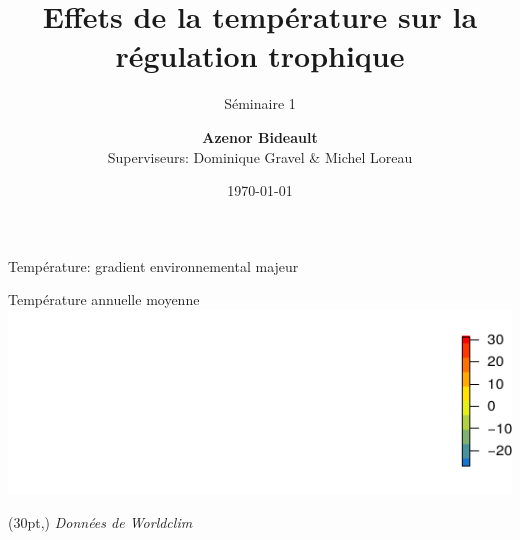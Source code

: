 \documentclass[11pt, compress, aspectratio=1610]{beamer}
\title{Effets de la température sur la régulation trophique}
\subtitle{Séminaire 1}
\date{\today}
\author{\textbf{Azenor Bideault}\\
Superviseurs: Dominique Gravel \& Michel Loreau \newline}
\institute{Université de Sherbooke}
\newcommand\smallcitation[1]{%
\begin{textblock*}{\textwidth}(30pt,\textheight)
    \raggedleft \small\textit{#1}
\end{textblock*}}
\begin{document}
\maketitle

\begin{frame}{Température: gradient environnemental majeur}

\centering
Température annuelle moyenne
\includegraphics[width=1\linewidth]{figuresAz/AnmeanTempST.pdf}
\smallcitation{Données de Worldclim}

\end{frame}
\end{document}
